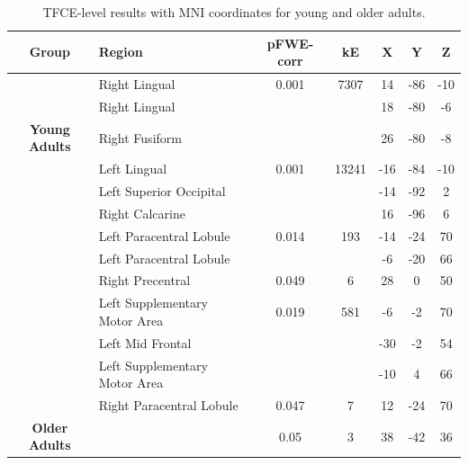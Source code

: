 \documentclass[a4paper,fleqn]{cas-sc}
\begin{document}
\begin{table}[h!]
\centering
\begin{tabular}{|c|l|c|c|c|c|c|}
\hline
\rowcolor[HTML]{D0D0D0} 
\textbf{Group}           & \textbf{Region}                 & \textbf{pFWE-corr} & \textbf{kE} & \textbf{X}   & \textbf{Y}  & \textbf{Z}  \\ \hline
                         & Right Lingual                  & 0.001             & 7307        & 14           & -86         & -10         \\ 
                         & Right Lingual                  &                   &             & 18           & -80         & -6          \\ 
\multirow{-3}{*}{\textbf{Young Adults}}  
                         & Right Fusiform                 &                   &             & 26           & -80         & -8          \\ \hline
                         & Left Lingual                   & 0.001             & 13241       & -16          & -84         & -10         \\ 
                         & Left Superior Occipital        &                   &             & -14          & -92         & 2           \\ 
                         & Right Calcarine                &                   &             & 16           & -96         & 6           \\ 
                         & Left Paracentral Lobule        & 0.014             & 193         & -14          & -24         & 70          \\ 
                         & Left Paracentral Lobule        &                   &             & -6           & -20         & 66          \\ 
                         & Right Precentral               & 0.049             & 6           & 28           & 0           & 50          \\ 
                         & Left Supplementary Motor Area  & 0.019             & 581         & -6           & -2          & 70          \\ 
                         & Left Mid Frontal               &                   &             & -30          & -2          & 54          \\ 
                         & Left Supplementary Motor Area  &                   &             & -10          & 4           & 66          \\ 
                         & Right Paracentral Lobule       & 0.047             & 7           & 12           & -24         & 70          \\ 
\multirow{-11}{*}{\textbf{Older Adults}} 
                         & \cellcolor[HTML]{EAEAEA}       & 0.05              & 3           & 38           & -42         & 36          \\ \hline
\end{tabular}
\caption{TFCE-level results with MNI coordinates for young and older adults.}
\label{tab:tfce}
\end{table}
\end{document}
